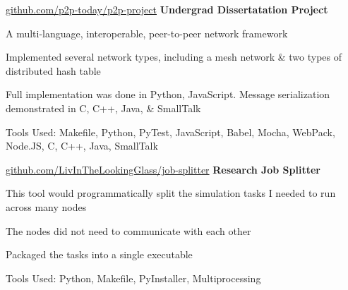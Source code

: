 	\begin{samepage}
		\begin{twocolentry}
			{\hspace{-3 cm} \href{https://github.com/p2p-today/p2p-project}{ \mbox{github.com/p2p-today/p2p-project}} } \textbf{Undergrad Dissertatation Project}
		\end{twocolentry}
	
		\begin{onecolentry}
			\begin{highlights}
				\item A multi-language, interoperable, peer-to-peer network framework
				\item Implemented several network types, including a mesh network \& two types of distributed hash table
				\item Full implementation was done in Python, JavaScript. Message serialization demonstrated in C, C+\!+, Java, \& SmallTalk
				\item Tools Used: Makefile, Python, PyTest, JavaScript, Babel, Mocha, WebPack, Node.JS, C, C+\!+, Java, SmallTalk
			\end{highlights}
		\end{onecolentry}
	\end{samepage}

	\vspace{0.2 cm}

	\begin{samepage}
		\begin{twocolentry}
			{\hspace{-3 cm} \href{https://github.com/LivInTheLookingGlass/job-splitter}{ \mbox{github.com/LivInTheLookingGlass/job-splitter}} } \textbf{Research Job Splitter}
		\end{twocolentry}
	
		\begin{onecolentry}
			\begin{highlights}
				\item This tool would programmatically split the simulation tasks I needed to run across many nodes
				\item The nodes did not need to communicate with each other
				\item Packaged the tasks into a single executable
				\item Tools Used: Python, Makefile, PyInstaller, Multiprocessing
			\end{highlights}
		\end{onecolentry}
	\end{samepage}

